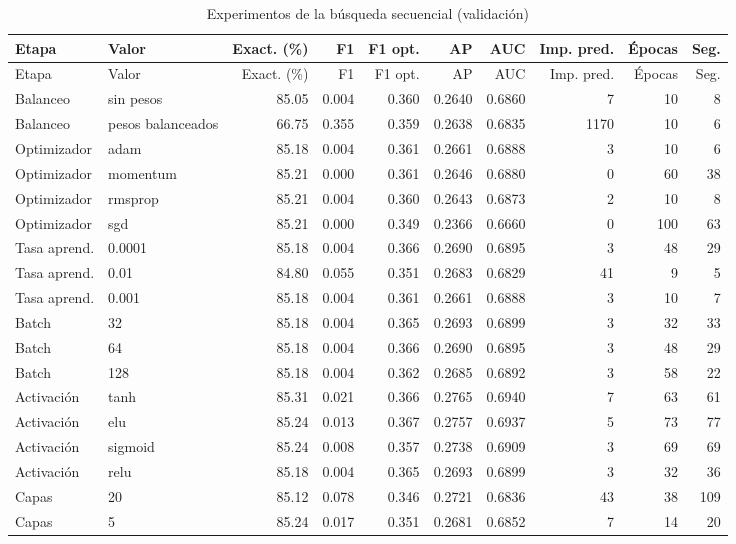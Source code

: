 \documentclass[12pt,a4paper]{article}
\begin{document}
{\footnotesize
\setlength{\tabcolsep}{3pt}
\begin{longtable}{llrrrrrrrr}
\caption{Experimentos de la búsqueda secuencial (validación)}\label{tab:anexo}\\
\toprule
Etapa & Valor & Exact. (\%) & F1 & F1 opt. & AP & AUC & Imp. pred. & Épocas & Seg. \\
\midrule
\endfirsthead
\toprule
Etapa & Valor & Exact. (\%) & F1 & F1 opt. & AP & AUC & Imp. pred. & Épocas & Seg. \\
\midrule
\endhead
\bottomrule
\endfoot
Balanceo & sin pesos & 85.05 & 0.004 & 0.360 & 0.2640 & 0.6860 & 7 & 10 & 8 \\
Balanceo & pesos balanceados & 66.75 & 0.355 & 0.359 & 0.2638 & 0.6835 & 1170 & 10 & 6 \\
Optimizador & adam & 85.18 & 0.004 & 0.361 & 0.2661 & 0.6888 & 3 & 10 & 6 \\
Optimizador & momentum & 85.21 & 0.000 & 0.361 & 0.2646 & 0.6880 & 0 & 60 & 38 \\
Optimizador & rmsprop & 85.21 & 0.004 & 0.360 & 0.2643 & 0.6873 & 2 & 10 & 8 \\
Optimizador & sgd & 85.21 & 0.000 & 0.349 & 0.2366 & 0.6660 & 0 & 100 & 63 \\
Tasa aprend. & 0.0001 & 85.18 & 0.004 & 0.366 & 0.2690 & 0.6895 & 3 & 48 & 29 \\
Tasa aprend. & 0.01 & 84.80 & 0.055 & 0.351 & 0.2683 & 0.6829 & 41 & 9 & 5 \\
Tasa aprend. & 0.001 & 85.18 & 0.004 & 0.361 & 0.2661 & 0.6888 & 3 & 10 & 7 \\
Batch & 32 & 85.18 & 0.004 & 0.365 & 0.2693 & 0.6899 & 3 & 32 & 33 \\
Batch & 64 & 85.18 & 0.004 & 0.366 & 0.2690 & 0.6895 & 3 & 48 & 29 \\
Batch & 128 & 85.18 & 0.004 & 0.362 & 0.2685 & 0.6892 & 3 & 58 & 22 \\
Activación & tanh & 85.31 & 0.021 & 0.366 & 0.2765 & 0.6940 & 7 & 63 & 61 \\
Activación & elu & 85.24 & 0.013 & 0.367 & 0.2757 & 0.6937 & 5 & 73 & 77 \\
Activación & sigmoid & 85.24 & 0.008 & 0.357 & 0.2738 & 0.6909 & 3 & 69 & 69 \\
Activación & relu & 85.18 & 0.004 & 0.365 & 0.2693 & 0.6899 & 3 & 32 & 36 \\
Capas & 20 & 85.12 & 0.078 & 0.346 & 0.2721 & 0.6836 & 43 & 38 & 109 \\
Capas & 5 & 85.24 & 0.017 & 0.351 & 0.2681 & 0.6852 & 7 & 14 & 20 \\

\end{longtable}}
\end{document}
